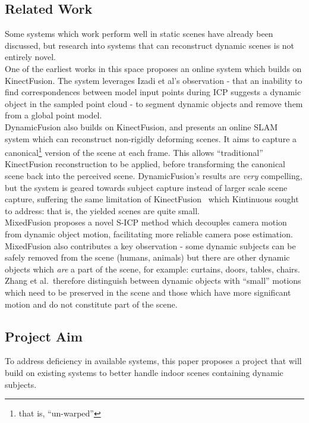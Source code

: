 \subsection{Related Work}\label{subsec:related-work}
Some systems which work perform well in static scenes have already been discussed\cite{kinectfusionms, kintinuous, elasticfusion},
but research into systems that can reconstruct dynamic scenes is not entirely novel.
\\[1ex]
One of the earliest works in this space\cite{Keller:2013aa} proposes an online system which builds on KinectFusion\cite{kinectfusionms}.
The system leverages Izadi et al's\cite{izadi2011kinectfusion} observation - that an inability to find correspondences
between model input points during ICP suggests a dynamic object in the sampled point cloud - to segment dynamic objects
and remove them from a global point model.
\\[1ex]
DynamicFusion\cite{dynamicfusion} also builds on KinectFusion\cite{kinectfusionms}, and presents an online SLAM system
which can reconstruct non-rigidly deforming scenes.
It aims to capture a canonical\footnote{that is, ``un-warped''} version of the scene at each frame.
This allows ``traditional'' KinectFusion reconstruction to be applied, before transforming the canonical scene back into
the perceived scene.
DynamicFusion's results are \emph{very} compelling, but the system is geared towards subject capture instead of larger
scale scene capture, suffering the same limitation of KinectFusion~\cite{kinectfusionms} which Kintinuous\cite{kintinuous}
sought to address: that is, the yielded scenes are quite small.
\\[1ex]
MixedFusion\cite{Zhang:2018aa} proposes a novel S-ICP method which decouples camera motion from dynamic object motion,
facilitating more reliable camera pose estimation.
MixedFusion also contributes a key observation - some dynamic subjects can be safely removed from the scene (humans,
animals) but there are other dynamic objects which \emph{are} a part of the scene, for example: curtains, doors, tables,
chairs.
Zhang et al.\ therefore distinguish between dynamic objects with ``small'' motions which need to be preserved in the scene
and those which have more significant motion and do not constitute part of the scene.

\subsection{Project Aim}\label{subsec:proposed-project}
To address deficiency in available systems, this paper proposes a project that will build on existing systems to better
handle indoor scenes containing dynamic subjects.
